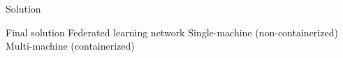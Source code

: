 

\begin{frame}{Solution}

\begin{outline}

\0 Final solution
    \1 Federated learning network
    \1 Single-machine (non-containerized)
    \1 Multi-machine (containerized)
    

\end{outline}

\end{frame}